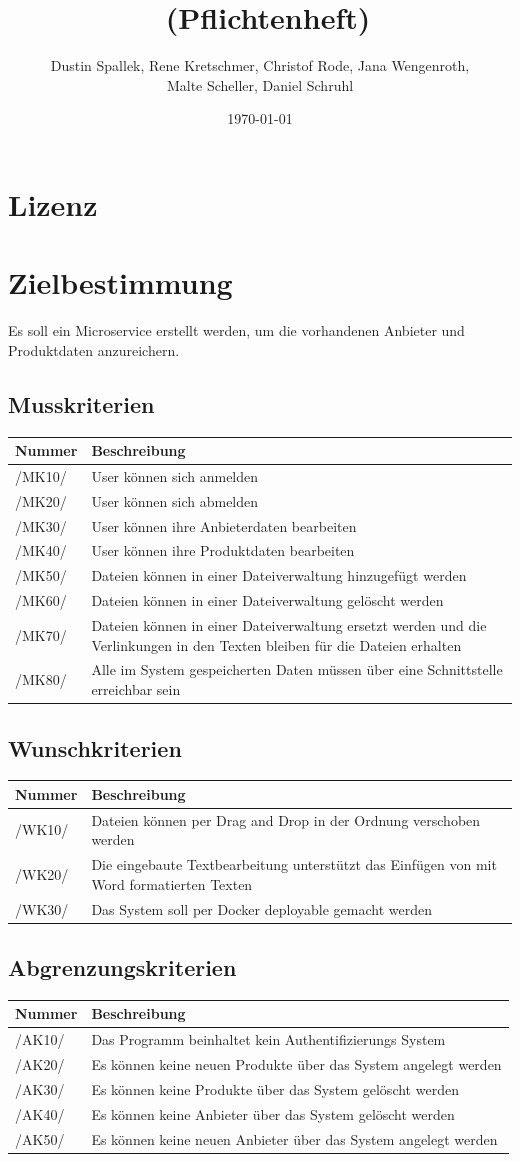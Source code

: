 \documentclass[a4paper,12pt]{article}
\title{\projektName~(Pflichtenheft)}
\author{Dustin Spallek, Rene Kretschmer, Christof Rode, Jana Wengenroth, \\Malte Scheller, Daniel Schruhl}
\date{\today}
\newcommand\addrow[2]{#1 &#2\\ }
\newcommand\addheading[2]{#1 &#2\\ \hline}
\newcommand\tabularhead{\begin{tabular}{lp{13cm}}
\hline
}
\newenvironment{usecase}{\tabularhead}
{\hline\end{tabular}}
\begin{document}
 \setcounter{page}{2}
 \tableofcontents          %
 \clearpage

\section{Lizenz}

 
\section{Zielbestimmung}

Es soll ein Microservice erstellt werden, um die vorhandenen Anbieter und Produktdaten anzureichern.

\subsection{Musskriterien}
\begin{usecase}
  \addheading{Nummer}{Beschreibung} 
  \addrow{/MK10/}{User können sich anmelden}
  \addrow{/MK20/}{User können sich abmelden}
  \addrow{/MK30/}{User können ihre Anbieterdaten bearbeiten}
  \addrow{/MK40/}{User können ihre Produktdaten bearbeiten}
  \addrow{/MK50/}{Dateien können in einer Dateiverwaltung hinzugefügt werden}
  \addrow{/MK60/}{Dateien können in einer Dateiverwaltung gelöscht werden}
  \addrow{/MK70/}{Dateien können in einer Dateiverwaltung ersetzt werden und die
   Verlinkungen in den Texten bleiben für die Dateien erhalten}
  \addrow{/MK80/}{Alle im System gespeicherten Daten müssen über eine Schnittstelle erreichbar sein}
\end{usecase}

\subsection{Wunschkriterien}
\begin{usecase}
  \addheading{Nummer}{Beschreibung} 
  \addrow{/WK10/}{Dateien können per Drag and Drop in der Ordnung verschoben werden}
  \addrow{/WK20/}{Die eingebaute Textbearbeitung unterstützt das Einfügen von mit Word formatierten Texten}
  \addrow{/WK30/}{Das System soll per Docker deployable gemacht werden}
\end{usecase}

\subsection{Abgrenzungskriterien}
\begin{usecase}
  \addheading{Nummer}{Beschreibung} 
  \addrow{/AK10/}{Das Programm beinhaltet kein Authentifizierungs System}
  \addrow{/AK20/}{Es können keine neuen Produkte über das System angelegt werden}
  \addrow{/AK30/}{Es können keine Produkte über das System gelöscht werden}
  \addrow{/AK40/}{Es können keine Anbieter über das System gelöscht werden}
  \addrow{/AK50/}{Es können keine neuen Anbieter über das System angelegt werden}
\end{usecase}
\end{document}
